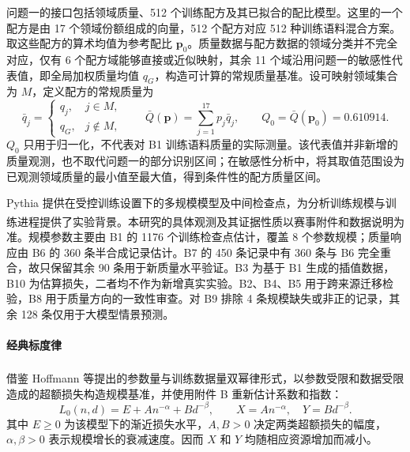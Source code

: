 \documentclass[bwprint]{gmcmthesis}
\numberwithin{equation}{section}
\numberwithin{figure}{section}
\numberwithin{table}{section}
\begin{document}
        问题一的接口包括领域质量、512 个训练配方及其已拟合的配比模型。这里的一个配方是由 17 个领域份额组成的向量，512 个配方对应 512 种训练语料混合方案。取这些配方的算术均值为参考配比 $\bm p_0$。质量数据与配方数据的领域分类并不完全对应，仅有 6 个配方域能够直接或近似映射，其余 11 个域沿用问题一的敏感性代表值，即全局加权质量均值 $q_G$，构造可计算的常规质量基准。设可映射领域集合为 $M$，定义配方的常规质量为
        \begin{equation}
         \bar q_j=\begin{cases}q_j,&j\in M,\\q_G,&j\notin M,\end{cases}
         \qquad \bar Q(\bm p)=\sum_{j=1}^{17}p_j\bar q_j,
         \qquad Q_0=\bar Q(\bm p_0)=0.610914.
         \label{eq:p2_quality}
        \end{equation}
        $Q_0$ 只用于归一化，不代表对 B1 训练语料质量的实际测量。该代表值并非新增的质量观测，也不取代问题一的部分识别区间；在敏感性分析中，将其取值范围设为已观测领域质量的最小值至最大值，得到条件性的配方质量区间。
        
        Pythia 提供在受控训练设置下的多规模模型及中间检查点，为分析训练规模与训练进程提供了实验背景\textsuperscript{\cite{biderman2023pythia}}。本研究的具体观测及其证据性质以赛事附件和数据说明为准。规模参数主要由 B1 的 1176 个训练检查点估计，覆盖 8 个参数规模；质量响应由 B6 的 360 条半合成记录估计。B7 的 450 条记录中有 360 条与 B6 完全重合，故只保留其余 90 条用于新质量水平验证。B3 为基于 B1 生成的插值数据，B10 为估算损失，二者均不作为新增真实实验。B2、B4、B5 用于跨来源迁移检验，B8 用于质量方向的一致性审查。对 B9 排除 4 条规模缺失或非正的记录，其余 128 条仅用于大模型情景预测。
    
        \paragraph{经典标度律}
        借鉴 Hoffmann 等提出的参数量与训练数据量双幂律形式\textsuperscript{\cite{hoffmann2022chinchilla}}，以参数受限和数据受限造成的超额损失构造规模基准，并使用附件 B 重新估计系数和指数：
        \begin{equation}
         L_0(n,d)=E+A n^{-\alpha}+B d^{-\beta},\qquad
         X=A n^{-\alpha},\quad Y=B d^{-\beta}.
         \label{eq:p2_baseline}
        \end{equation}
        其中 $E\geq0$ 为该模型下的渐近损失水平，$A,B>0$ 决定两类超额损失的幅度，$\alpha,\beta>0$ 表示规模增长的衰减速度。因而 $X$ 和 $Y$ 均随相应资源增加而减小。
        
\end{document}

